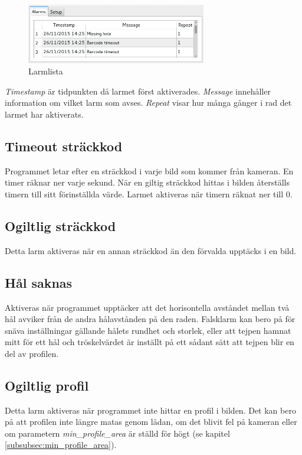 \documentclass[a4paper]{article}
\begin{document}
	\begin{figure}[H]
	  	\centering
		\includegraphics[width=0.7\textwidth]{alarm_list}
		\caption{Larmlista}\label{fig:alarm_list}
	\end{figure}
	\textit{Timestamp} är tidpunkten då larmet först aktiverades. \textit{Message} innehåller information om vilket larm som avses. \textit{Repeat} visar hur många gånger i rad det larmet har aktiverats.

	\subsection{Timeout sträckkod}\label{subsec:barcode_timeout}
		Programmet letar efter en sträckkod i varje bild som kommer från kameran. En timer räknar ner varje sekund.
		När en giltig sträckkod hittas i bilden återställs timern till sitt förinställda värde. Larmet aktiveras när timern räknat ner till 0.

	\subsection{Ogiltlig sträckkod}\label{subsec:invalid_barcode}
		Detta larm aktiveras när en annan sträckkod än den förvalda upptäcks i en bild.

	\subsection{Hål saknas}\label{subsec:missing_hole}
		Aktiveras när programmet upptäcker att det horisontella avståndet mellan två hål avviker från de andra hålavstånden på den raden.
		Falsklarm kan bero på för snäva inställningar gällande hålets rundhet och storlek, eller att tejpen hamnat mitt för ett hål och tröskelvärdet är inställt
		på ett sådant sätt att tejpen blir en del av profilen.

	\subsection{Ogiltlig profil}\label{subsec:invalid_profile}
	Detta larm aktiveras när programmet inte hittar en profil i bilden. Det kan bero på att profilen inte längre matas genom lådan, om det blivit fel på kameran eller om parametern \textit{min\_profile\_area}
	är ställd för högt (se kapitel \ref{subsubsec:min_profile_area}).
\end{document}
